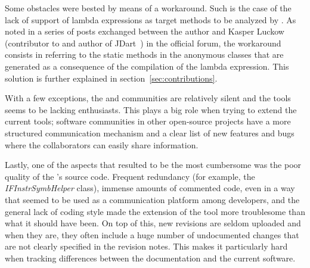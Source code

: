 Some obstacles were bested by means of a workaround. Such is the case of the lack of support of lambda expressions as target methods to be analyzed by \spf{}. As noted in a series of posts exchanged between the author and Kasper Luckow (contributor to \spf{} and author of JDart~\cite{Luckow2016}) in the official \jpf{} forum, the workaround consists in referring to the static methods in the anonymous classes that are generated as a consequence of the compilation of the lambda expression. This solution is further explained in section~\ref{sec:contributions}.

With a few exceptions, the \jpf{} and \spf{} communities are relatively silent and the tools seems to be lacking enthusiasts. This plays a big role when trying to extend the current tools; software communities in other open-source projects have a more structured communication mechanism and a clear list of new features and bugs where the collaborators can easily share information.

Lastly, one of the aspects that resulted to be the most cumbersome was the poor quality of the \spf{}'s source code. Frequent redundancy (for example, the \textit{IFInstrSymbHelper} class), immense amounts of commented code, even in a way that seemed to be used as a communication platform among developers, and the general lack of coding style made the extension of the tool more troublesome than what it should have been. On top of this, new revisions are seldom uploaded and when they are, they often include a huge number of undocumented changes that are not clearly specified in the revision notes. This makes it particularly hard when tracking differences between the documentation and the current software.